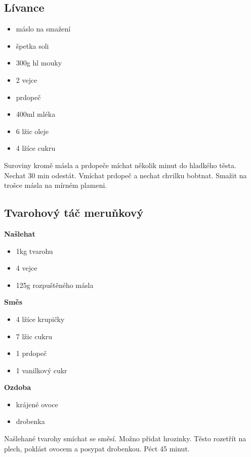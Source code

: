 \documentclass[10pt,a4paper]{article}
\newenvironment{myitemize}
{ \begin{itemize}
    \setlength{\itemsep}{0pt}
    \setlength{\parskip}{0pt}
    \setlength{\parsep}{0pt}     }
{ \end{itemize}                  }
\begin{document}
\subsection{Lívance}
\begin{minipage}[t]{0,5\textwidth}
\begin{myitemize} 
\item máslo na smažení
\item špetka soli
\item 300g hl mouky
\item 2 vejce
\item prdopeč
\item 400ml mléka
\item 6 lžic oleje
\item 4 lžíce cukru
\end{myitemize}
\end{minipage}
\begin{minipage}[t]{0,5\textwidth}
Suroviny kromě másla a prdopeče míchat několik minut do hladkého těsta. Nechat 30 min odestát. Vmíchat prdopeč a nechat chvilku bobtnat. Smažit na trošce másla na mírném plameni.
\end{minipage}

\subsection{Tvarohový táč meruňkový}
\begin{minipage}[t]{0,5\textwidth}
\textbf{Našlehat}
\begin{myitemize} 
\item 1kg tvarohu
\item 4 vejce
\item 125g rozpuštěného másla
\end{myitemize}
\textbf{Směs}
\begin{myitemize} 
\item 4 lžíce krupičky
\item 7 lžic cukru
\item 1 prdopeč
\item 1 vanilkový cukr
\end{myitemize}

\textbf{Ozdoba}
\begin{myitemize} 
\item krájené ovoce
\item drobenka
\end{myitemize}

\end{minipage}
\begin{minipage}[t]{0,5\textwidth}
Našlehané tvarohy smíchat se směsí. Možno přidat hrozinky. Těsto rozetřít na plech, poklást ovocem a posypat drobenkou. Péct 45 minut. 
\end{minipage}
\end{document}
